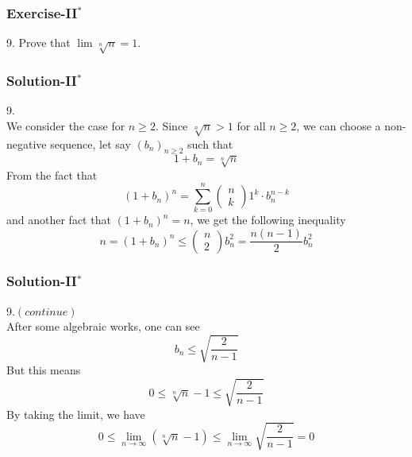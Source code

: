 \documentclass[12pt, t]{beamer}
\begin{document}
\begin{frame}
    \frametitle{Exercise-II$^*$}
    9. Prove that $\lim \sqrt[n]{n}=1$.
\end{frame}

\begin{frame}
    \frametitle{Solution-II$^*$}
    9.\\
    \hspace{1em} We consider the case for $n\geq 2$. Since $\sqrt[n]{n}>1$ for all $n\geq 2$, we can choose a
    non-negative sequence, let say $(b_n)_{n\geq 2}$ such that
    \begin{equation*}
        1+b_n=\sqrt[n]{n}
    \end{equation*}
    \hspace{1em} From the fact that
    \begin{equation*}
        (1+b_n)^n=\sum^n_{k=0}\left(\begin{smallmatrix}n\\k\end{smallmatrix}\right)1^k\cdot b_n^{n-k}
    \end{equation*}
    and another fact that $(1+b_n)^n=n$, we get the following inequality
    \begin{equation*}
        n=(1+b_n)^n\leq \left(\begin{smallmatrix}n \\ 2\end{smallmatrix}\right) b^2_n=\frac{n(n-1)}{2}b^2_n
    \end{equation*}
\end{frame}

\begin{frame}
    \frametitle{Solution-II$^*$}
    9.$(continue)$\\
    \hspace{1em} After some algebraic works, one can see
    \begin{equation*}
        b_n\leq\sqrt{\frac{2}{n-1}}
    \end{equation*}
    \hspace{1em} But this means
    \begin{equation*}
        0\leq \sqrt[n]{n}-1\leq \sqrt{\frac{2}{n-1}}
    \end{equation*}
    \hspace{1em} By taking the limit, we have
    \begin{equation*}
        0\leq \lim_{n\rightarrow\infty}(\sqrt[n]{n}-1)\leq \lim_{n\rightarrow\infty}\sqrt{\frac{2}{n-1}}=0
    \end{equation*}
\end{frame}
\end{document}
